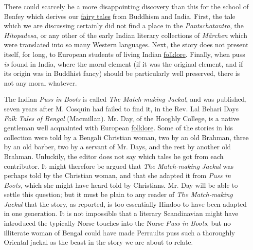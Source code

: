 \documentclass[14pt,a4paper]{memoir}
\newcommand{\ul}[1]{\uline{#1}}
\begin{document}
{There could scarcely be a more disappointing discovery than this for the
school of Benfey which derives our \ul{fairy tales} from Buddhism and
India. First, the tale which we are discussing certainly did not find a
place in the \emph{Pantschatantra}, the \emph{Hitopadesa}, or any other
of the early Indian literary collections of \emph{Märchen} which were
translated into so many Western languages. Next, the story does not
present itself, for long, to European students of living Indian
\ul{folklore}. Finally, when puss \emph{is} found in India, where the
moral element (if it was the original element, and if its origin was in
Buddhist fancy) should be particularly well preserved, there is not any
moral whatever.

The Indian \emph{Puss in Boots} is called \emph{The Match-making
Jackal}, and was published, seven years after M. Cosquin had failed to
find it, in the Rev. Lal Behari Day\textquotesingle s \emph{Folk Tales
of Bengal} (Macmillan). Mr. Day, of the Hooghly College, is a native
gentleman well acquainted with European \ul{folklore}. Some of the
stories in his collection were told by a Bengali Christian woman, two by
an old Brahman, three by an old barber, two by a servant of Mr.
Day\textquotesingle s, and the rest by another old Brahman. Unluckily,
the editor does not say which tales he got from each contributor. It
might therefore be argued that \emph{The Match-making Jackal} was
perhaps told by the Christian woman, and that she adapted it from
\emph{Puss in Boots}, which she might have heard told by Christians. Mr.
Day will be able to settle this question; but it must be plain to any
reader of \emph{The Match-making Jackal} that the story, as reported, is
too essentially Hindoo to have been
\textquotesingle adapted\textquotesingle{} in one generation. It is not
impossible that a literary Scandinavian might have introduced the
typically Norse touches into the Norse \emph{Puss in Boots}, but no
illiterate woman of Bengal could have made Perrault\textquotesingle s
puss such a thoroughly Oriental jackal as the beast in the story we are
about to relate.

}
\end{document}
